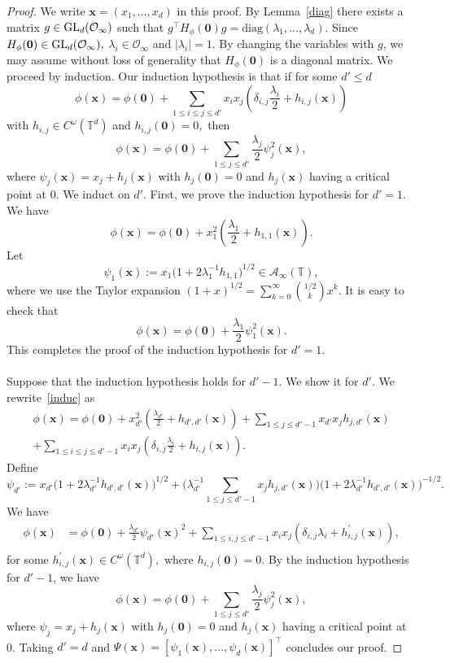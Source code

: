 \documentclass[10pt]{amsart}
\theoremstyle{plain}
\theoremstyle{plain}
\renewcommand{\vec}[1]{\mathbf{#1}}
\theoremstyle{remark}
\theoremstyle{definition}
\newcommand{\GL}{\textup{GL}}
\newcommand{\TT}{\mathbb{T}}
\newcommand{\cA}{\mathcal{A}}
\newcommand{\cO}{\mathcal{O}}
\begin{document}
\begin{proof} We write $\vec{x}=(x_1,\hdots,x_d)$ in this proof. By Lemma~\ref{diag} there exists a matrix $g\in \GL_d(\cO_{\infty})$ such that $g^{\intercal} H_{\phi}(\vec{0})g=\text{diag}(\lambda_1,\dots,\lambda_d).$ Since $H_{\phi}(\vec{0}) \in \GL_d(\cO_{\infty}),$    $\lambda_i \in \cO_{\infty}$ and $|\lambda_i|=1.$ By changing the variables with $g$, we may assume without loss of generality that $H_{\phi}(\vec{0})$ is a diagonal matrix. We proceed by induction. Our induction hypothesis is that if for some $d'\leq d$
\[
 \phi(\vec{x})= \phi(\vec{0})+\sum_{1 \leq i\leq  j\leq d'}x_ix_j(\delta_{i,j}\frac{\lambda_i}{2}+h_{i,j}(\vec{x}))
\]
with   $h_{i,j}\in C^{\omega}(\TT^{d})$ and $h_{i,j}(\vec{0})=0,$  then
\begin{equation}\label{induc}
\phi(\vec{x})=\phi(\vec{0})+\sum_{1\leq j \leq d' }\frac{\lambda_j}{2} \psi_j^2(\vec{x}),
\end{equation}
where $\psi_{j}(\vec{x})=x_j+h_j(\vec{x})$ with $h_j(\vec{0})=0$ and $h_j(\vec{x})$ having a critical point at 0. We induct on $d'.$ First, we prove the induction hypothesis  for $d'=1.$  We have
\[
 \phi(\vec{x})=  \phi(\vec{0})+ x_1^2\left(\frac{\lambda_1}{2}+h_{1,1}(\vec{x})\right).
\]
Let 
\[
\psi_1(\vec{x}):=x_1\big(1+2\lambda_1^{-1}h_{1,1}\big)^{1/2}\in  \cA_{\infty}(\TT),
\]
where we use the Taylor expansion $(1+x)^{1/2}=\sum_{k=0}^{\infty}\binom{1/2}{k}x^k.$ It is easy to check that 
\[
\phi(\vec{x})= \phi(\vec{0})+\frac{\lambda_1}{2} \psi_1^2(\vec{x}).
\] This completes the proof of the induction hypothesis for $d'=1.$
 \\
\\


Suppose that the induction hypothesis holds for $d'-1.$ We show it for $d'.$ We rewrite~\eqref{induc} as
\begin{multline*}
 \phi(\vec{x})= \phi(\vec{0})+ x_{d'}^2(\frac{\lambda_{d'}}{2}+h_{d',d'}(\vec{x}))+ \sum_{1\leq j  \leq d'-1  }x_{d'}x_j h_{j,d'}(\vec{x}) 
\\
  +\sum_{1\leq i\leq j \leq d'-1 }x_ix_j(\delta_{i,j}\frac{\lambda_i}{2}+h_{i,j}(\vec{x})).
\end{multline*}
Define 
\[
\psi_{d'}:=x_{d'}\big(1+2\lambda_{d'}^{-1}h_{d',d'}(\vec{x})\big)^{1/2}+\big(\lambda_{d'}^{-1}\sum_{1 \leq j \leq d'-1 }x_j h_{j,d'}(\vec{x}) \big)\big(1+2\lambda_{d'}^{-1}h_{d',d'}(\vec{x})\big)^{-1/2}.
\] We have 
\begin{equation}
\begin{split}
\phi (\vec{x})&=\phi(\vec{0})+\frac{\lambda_{d'}}{2} \psi_{d'}(\vec{x})^2+\sum_{1\leq i,j\leq d'-1 }x_ix_j(\delta_{i,j}\lambda_i+h^{\prime}_{i,j}(\vec{x})),\\
\end{split}
\end{equation}
for some $h^{\prime}_{i,j}(\vec{x})\in C^{\omega}(\TT^d),$ where $h_{i,j}(\vec{0})=0.$ By the induction hypothesis for $d'-1$, we have   
\[
\phi(\vec{x})=\phi(\vec{0})+\sum_{1\leq j \leq d' }\frac{\lambda_j}{2} \psi_j^2(\vec{x}),
\]
where $\psi_{j}=x_j+h_j(\vec{x})$ with $h_j(\vec{0})=0$ and $h_j(\vec{x})$ having a critical point at 0. Taking $d'=d$ and $\Psi(\vec{x})=[\psi_1(\vec{x}),\hdots,\psi_d(\vec{x})]^{\intercal}$ concludes our proof. 
\end{proof}
\end{document}
